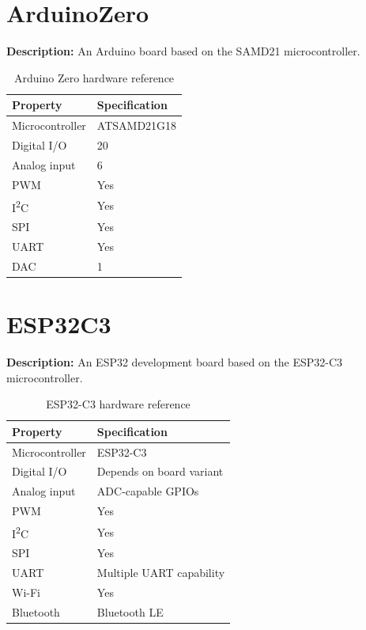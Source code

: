 \newpage
\section{ArduinoZero}

\textbf{Description:} An Arduino board based on the SAMD21 microcontroller.

\begin{table}[H]
\centering
\caption{Arduino Zero hardware reference}
\label{tab:board-zero}
\begin{tabular}{ll}
\toprule
\textbf{Property} & \textbf{Specification} \\
\midrule
Microcontroller & ATSAMD21G18 \\
Digital I/O & 20 \\
Analog input & 6 \\
PWM & Yes \\
I\textsuperscript{2}C & Yes \\
SPI & Yes \\
UART & Yes \\
DAC & 1 \\
\bottomrule
\end{tabular}
\end{table}

\section{ESP32C3}

\textbf{Description:} An ESP32 development board based on the ESP32-C3
microcontroller.

\begin{table}[H]
\centering
\caption{ESP32-C3 hardware reference}
\label{tab:board-esp32-c3}
\begin{tabular}{ll}
\toprule
\textbf{Property} & \textbf{Specification} \\
\midrule
Microcontroller & ESP32-C3 \\
Digital I/O & Depends on board variant \\
Analog input & ADC-capable GPIOs \\
PWM & Yes \\
I\textsuperscript{2}C & Yes \\
SPI & Yes \\
UART & Multiple UART capability \\
Wi-Fi & Yes \\
Bluetooth & Bluetooth LE \\
\bottomrule
\end{tabular}
\end{table}


